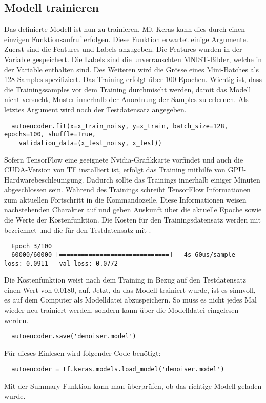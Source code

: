 \subsection{Modell trainieren}
Das definierte Modell ist nun zu trainieren.
Mit Keras kann dies durch einen einzigen Funktionsaufruf erfolgen.
Diese Funktion erwartet einige Argumente. Zuerst sind die Features und Labels anzugeben. Die
Features wurden in der Variable  gespeichert. Die Labels
sind die unverrauschten MNIST-Bilder, welche in der Variable  enthalten sind.
Des Weiteren wird die Grösse eines Mini-Batches als 128 Samples spezifiziert. Das
Training erfolgt über 100 Epochen.
Wichtig ist, dass die Trainingssamples vor dem Training durchmischt werden,
damit das Modell nicht versucht, Muster innerhalb der Anordnung der Samples zu
erlernen. Als letztes Argument wird noch der Testdatensatz angegeben.
\begin{verbatim}
  autoencoder.fit(x=x_train_noisy, y=x_train, batch_size=128, epochs=100, shuffle=True,
    validation_data=(x_test_noisy, x_test))
\end{verbatim}
Sofern TensorFlow eine geeignete Nvidia-Grafikkarte vorfindet und auch die
CUDA-Version von TF installiert ist, erfolgt das Training mithilfe von GPU-Hardwarebeschleunigung.
Dadurch sollte das Trainings innerhalb einiger Minuten abgeschlossen sein.
Während des Trainings schreibt TensorFlow Informationen zum aktuellen Fortschritt in die
Kommandozeile. Diese Informationen weisen nachstehenden Charakter auf und geben
Auskunft über die aktuelle Epoche sowie die Werte der Kostenfunktion. Die Kosten
für den Trainingsdatensatz werden mit  bezeichnet und die für den
Testdatensatz mit .

\begin{verbatim}
  Epoch 3/100
  60000/60000 [==============================] - 4s 60us/sample - loss: 0.0911 - val_loss: 0.0772
\end{verbatim}
Die Kostenfunktion weist nach dem Training in Bezug auf den Testdatensatz einen Wert  von $0.0180$,
auf.
\para{}
Jetzt, da das Modell trainiert wurde, ist es sinnvoll, es auf dem Computer als
Modelldatei abzuspeichern. So muss es nicht jedes Mal wieder neu trainiert werden, sondern kann über
die Modelldatei eingelesen werden.
\begin{verbatim}
  autoencoder.save('denoiser.model')
\end{verbatim}
Für dieses Einlesen wird folgender Code benötigt:
\begin{verbatim}
  autoencoder = tf.keras.models.load_model('denoiser.model')
\end{verbatim}
Mit der Summary-Funktion kann man überprüfen, ob das richtige Modell geladen wurde.

